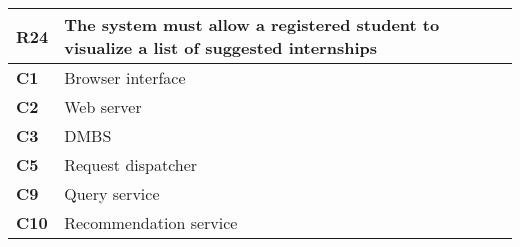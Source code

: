 \begin{table}[H]
    \centering
    \begin{tabular}{|l|m{10cm}|}
        \hline \textbf{R24} & The system must allow a registered student to visualize a list of suggested internships \\
        \hline \textbf{C1} & Browser interface \\
        \hline \textbf{C2} & Web server \\
        \hline \textbf{C3} & DMBS \\
        \hline \textbf{C5} & Request dispatcher \\
        \hline \textbf{C9} & Query service \\
        \hline \textbf{C10} & Recommendation service \\
        \hline
    \end{tabular}
\end{table}


